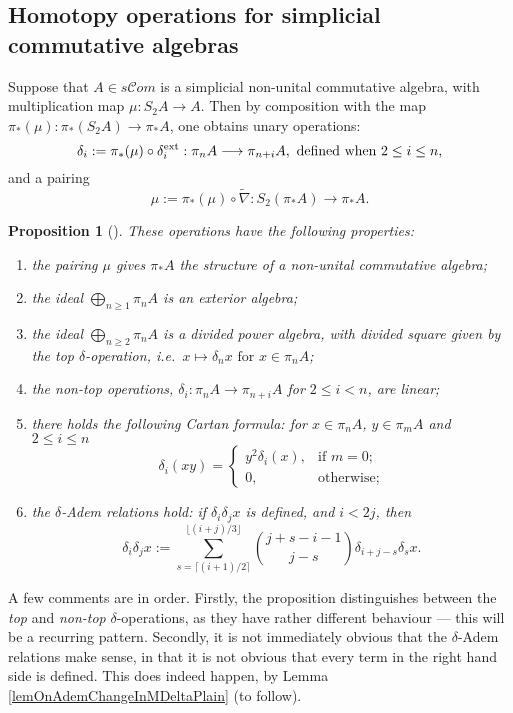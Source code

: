 \documentclass[11pt]{amsart} \renewcommand{\baselinestretch}{1.4}
\theoremstyle{plain}
\newtheorem{prop}[thm]{Proposition}
\theoremstyle{definition}
\renewcommand{\to}{\longrightarrow}
\newcommand{\scrC}{\mathscr{C}}
\newcommand{\algs}{{\scrC\!\textit{om}}}
\renewcommand{\mapsto}{\longmapsto}
\begin{document}
\begin{Constructing homotopy operations}
\subsection{Homotopy operations for simplicial commutative algebras}\label{Homotopy operations for simplicial commutative algebras}
Suppose that $A\in s \algs$ is a simplicial non-unital commutative algebra, with multiplication map $\mu:S_2A\to A$. Then by composition with the map $\pi_*(\mu):\pi_*(S_2A)\to \pi_*A$, one obtains unary operations:
\[\delta_i:=\pi_*(\mu)\circ\delta_i^\textup{ext}:\pi_nA\to \pi_{n+i}A,\textup{ defined when }2\leq i\leq n,\]
and a pairing\[\mu:=\pi_*(\mu)\circ\widetilde{\nabla}:S_2(\pi_*A)\to \pi_{*}A.\]
\begin{prop}[{\cite{DwyerHtpyOpsSimpComAlg.pdf}}]
\label{omnibus on htpy of simp algs}
These operations have the following properties:
\begin{enumerate}
\item the pairing $\mu$ gives $\pi_*A$ the structure of a non-unital commutative algebra;
\item the ideal $\bigoplus_{n\geq1}\pi_nA$ is an exterior algebra;
\item the ideal $\bigoplus_{n\geq2}\pi_nA$ is a divided power algebra, with divided square given by the \emph{top $\delta$-operation}, i.e.\ $x\mapsto \delta_nx\text{ for }x\in\pi_nA$;
\item the \emph{non-top operations}, $\delta_i:\pi_nA\to \pi_{n+i}A$ for $2\leq i<n$, are linear;
\item there holds the following \emph{Cartan formula}: for $x\in\pi_nA$, $y\in \pi_mA$ and $2\leq i\leq n$
\[\delta_i(xy)=\begin{cases}
y^2\delta_i(x),&\text{if }m=0;\\
0,&\text{otherwise};
\end{cases}
\]
\item \label{deltaademsunstable} the \emph{$\delta$-Adem relations} hold: if $\delta_i\delta_jx$ is defined, and $i<2j$, then
\[\delta_i\delta_jx:=\sum_{s=\lceil(i+1)/2\rceil}^{\lfloor(i+j)/3\rfloor}{j+s-i-1\choose j-s}\delta_{i+j-s}\delta_sx.\]
\end{enumerate}
\end{prop}
A few comments are in order. Firstly, the proposition distinguishes between the \emph{top} and \emph{non-top} $\delta$-operations, as they have rather different behaviour --- this will be a recurring pattern. Secondly, it is not immediately obvious that the $\delta$-Adem relations make sense, in that it is not obvious that every term in the right hand side is defined. This does indeed happen, by Lemma \ref{lemOnAdemChangeInMDeltaPlain} (to follow). 


\end{Constructing homotopy operations}
\end{document}
